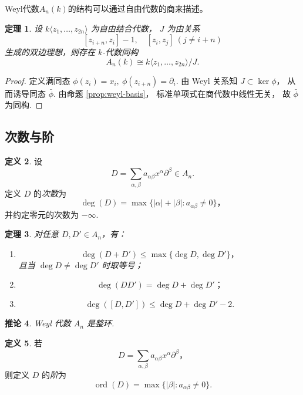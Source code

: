 \documentclass[11pt]{article}
\theoremstyle{plain}
\newtheorem{theorem}{定理}[section]
\newtheorem{corollary}[theorem]{推论}
\theoremstyle{definition}
\newtheorem{definition}[theorem]{定义}
\theoremstyle{remark}
\newcommand{\ord}{\operatorname{ord}}
\begin{document}
Weyl代数$A_n(k)$的结构可以通过自由代数的商来描述。

\begin{theorem}
    设 $k\langle z_1,\dots,z_{2n}\rangle$
    为自由结合代数，
    $J$ 为由关系
    \[
        [z_{i+n},z_i]-1,\quad
        [z_i,z_j]\ (j\neq i+n)
    \]
    生成的双边理想，则存在 $k$-代数同构
    \[
        A_n(k)\cong k\langle z_1,\dots,z_{2n}\rangle/J.
    \]
\end{theorem}

\begin{proof}
    定义满同态
    $\phi(z_i)=x_i,\ \phi(z_{i+n})=\partial_i$.
    由 Weyl 关系知 $J\subset\ker\phi$，
    从而诱导同态
    $\bar\phi$.
    由命题 \ref{prop:weyl-basis}，
    标准单项式在商代数中线性无关，
    故 $\bar\phi$ 为同构.
\end{proof}

\subsection{次数与阶}

\begin{definition}
    设
    \[
        D=\sum_{\alpha,\beta}
        a_{\alpha\beta}x^\alpha\partial^\beta\in A_n.
    \]
    定义 $D$ 的\emph{次数}为
    \[
        \deg(D)=\max\{|\alpha|+|\beta|:
        a_{\alpha\beta}\neq0\}，
    \]
    并约定零元的次数为 $-\infty$.
\end{definition}

\begin{theorem}
    对任意 $D,D'\in A_n$，有：
    \begin{enumerate}
        \item
              \[
                  \deg(D+D')\le\max\{\deg D,\deg D'\}，
              \]
              且当 $\deg D\neq\deg D'$ 时取等号；
        \item
              \[
                  \deg(DD')=\deg D+\deg D'；
              \]
        \item
              \[
                  \deg([D,D'])\le\deg D+\deg D'-2.
              \]
    \end{enumerate}
\end{theorem}

\begin{corollary}
    Weyl 代数 $A_n$ 是整环.
\end{corollary}

\begin{definition}
    若
    \[
        D=\sum_{\alpha,\beta}
        a_{\alpha\beta}x^\alpha\partial^\beta，
    \]
    则定义 $D$ 的\emph{阶}为
    \[
        \ord(D)=\max\{|\beta|:a_{\alpha\beta}\neq0\}.
    \]
\end{definition}
\end{document}
